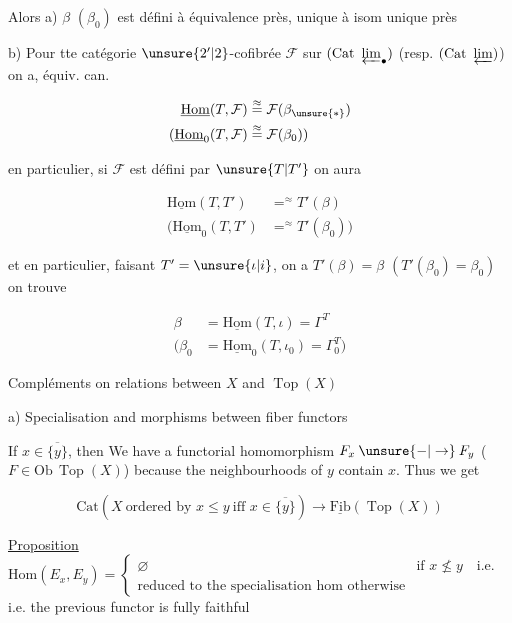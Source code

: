 Alors a) $\beta$ $(\beta_0)$ est défini à équivalence près,
 unique à isom unique près

b) Pour tte catégorie $\unsure{2'|2}$-cofibrée $\mathcal F$  sur $(\mathrm{Cat}\ \varprojlim_{\bullet})$
(resp. $(\mathrm{Cat}\ \varprojlim)$) on a, équiv. can.

\[
\begin{aligned}
\underline{\mathrm{Hom}}(T,\mathcal F)&\mathrel{\mathop{=}^{\approx}}\mathcal F(\beta_{\unsure{*}})\\
(\underline{\mathrm{Hom}}_0(T,\mathcal F)&\mathrel{\mathop{=}^{\approx}}\mathcal F(\beta_0))
\end{aligned}
\]

en particulier, si $\mathcal F$ est défini par $\unsure{T|T'}$ on aura

\[
\begin{aligned}
\underline{\mathrm{Hom}}(T,T')&\mathrel{\mathop{=}^{\approx}}T'(\beta)\\
(\underline{\mathrm{Hom}}_0(T,T')&\mathrel{\mathop{=}^{\approx}}T'(\beta_0))
\end{aligned}
\]

et en particulier, faisant $T'=\unsure{\iota|i}$,  on a $T'(\beta)=\beta$ $(T'(\beta_0)=\beta_0)$
on trouve

\[
\begin{aligned}
\beta&=\underline{\mathrm{Hom}}(T,\iota)=\Gamma^{T}\\
(\beta_0&=\underline{\mathrm{Hom}}_0(T,\iota_0)=\Gamma_0^{T})
\end{aligned}
\]

Compléments on relations between $X$ and $\operatorname{Top}(X)$

a) Specialisation and morphisms between fiber functors

If $x\in\overline{\{y\}}$, then We have a functorial homomorphism
$F_x\mathbin{\unsure{-|\to}}F_y$ ($F\in\mathrm{Ob}\,\operatorname{Top}(X)$) because the neighbourhoods of
$y$ contain $x$. Thus  we get 

\[
\mathrm{Cat}(X\ \text{ordered by }x\leq y\ \text{iff }x\in\overline{\{y\}})\longrightarrow
\underline{\mathrm{Fib}}(\operatorname{Top}(X))
\]

\uline{Proposition} $\mathrm{Hom}(E_x,E_y)=\left\{\begin{array}{ll}\varnothing&\text{if }x\nleq y\quad\text{i.e.}\\\text{reduced to the specialisation hom otherwise}\end{array}\right.$
i.e. the previous functor is fully faithful


